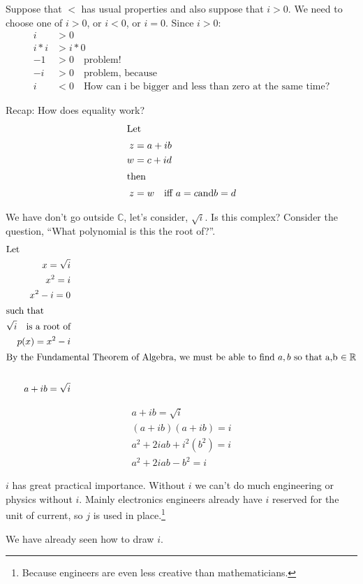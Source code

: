 Suppose that $<$ has usual properties and also suppose that $i > 0$. We need to
choose one of $i > 0$, or $i < 0$, or $i = 0$. Since $i > 0$:
\begin{align}
      i & > 0 \\
  i * i & > i*0 \\
  -1 & > 0 \quad \text{problem!} \\
  -i & > 0 \quad \text{problem, because} \\
   i & < 0 \quad \text{How can i be bigger and less than zero at the same time?}
\end{align}

Recap: How does equality work?
\begin{align}
  \intertext{Let}
    z & = a + ib \\
    w & = c + id \\
  \intertext{then}
    z & = w \quad \text{iff } a = c \text{and} b = d
\end{align}

We have don't go outside $\mathbb{C}$, let's consider, $\sqrt{i}$. Is this
complex? Consider the question, ``What polynomial is this the root of?''.
\begin{align}
  \intertext{Let}
    x = \sqrt{i} \\
    x^2 = i \\
    x^2 - i = 0 \\
  \intertext{such that}
  \sqrt{i} \quad \text{is a root of} \\
  p(x) = x^2 - i \\
  \intertext{By the Fundamental Theorem of Algebra, we must be able to find $a,b$
  so that a,b $\in \mathbb{R}$} \\
  a + ib = \sqrt{i} \\
\end{align}

\begin{align}
  a + ib = \sqrt{i} \\
  (a + ib)(a + ib) = i \\
  a^2 + 2iab + i^2(b^2) = i \\
  a^2 + 2iab - b^2 = i
\end{align}

$i$ has great practical importance. Without $i$ we can't do much engineering
or physics without $i$. Mainly electronics engineers already have $i$ reserved
for the unit of current, so $j$ is used in place.\footnote{Because engineers are
even less creative than mathematicians.}

We have already seen how to draw $i$.

